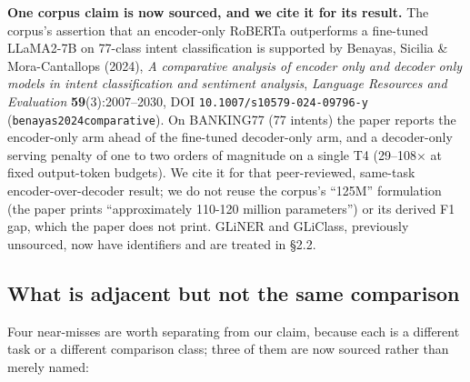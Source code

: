 \documentclass[10pt]{article}
\begin{document}
\textbf{One corpus claim is now sourced, and we cite it for its result.} The corpus's assertion that an encoder-only RoBERTa outperforms a fine-tuned LLaMA2-7B on 77-class intent classification is supported by Benayas, Sicilia \& Mora-Cantallops (2024), \emph{A comparative analysis of encoder only and decoder only models in intent classification and sentiment analysis}, \emph{Language Resources and Evaluation} \textbf{59}(3):2007--2030, DOI \texttt{10.1007/s10579-024-09796-y} (\texttt{benayas2024comparative}\cite{benayas2024comparative}). On BANKING77 (77 intents) the paper reports the encoder-only arm ahead of the fine-tuned decoder-only arm, and a decoder-only serving penalty of one to two orders of magnitude on a single T4 (29--108$\times$ at fixed output-token budgets). We cite it for that peer-reviewed, same-task encoder-over-decoder result; we do not reuse the corpus's ``125M'' formulation (the paper prints ``approximately 110-120 million parameters'') or its derived F1 gap, which the paper does not print. GLiNER and GLiClass, previously unsourced, now have identifiers and are treated in \S2.2.

\subsection{What is adjacent but not the same comparison}

Four near-misses are worth separating from our claim, because each is a different task or a different comparison class; three of them are now sourced rather than merely named:
\end{document}
